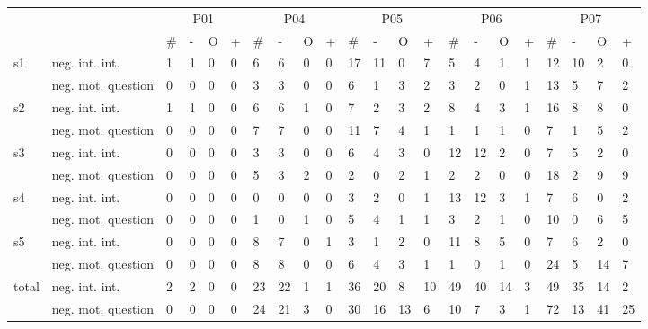 \begin{screenonly}
\begin{table*}[h]
\begin{small}
\begin{tabular*}{\hsize}{@{\extracolsep{\fill}}llllllllllllllllllllll}
      \toprule
      &  & \multicolumn{4}{c}{P01}  & \multicolumn{4}{c}{P04} & \multicolumn{4}{c}{P05} & \multicolumn{4}{c}{P06} & \multicolumn{4}{c}{P07}\\
      \cmidrule(lr){3-6}\cmidrule(lr){7-10}\cmidrule(lr){11-14}\cmidrule(lr){15-18}\cmidrule(lr){19-22}
      &  & \# & - & O & + & \# & - & O & + & \# & - & O & + & \# & - & O & + & \# & - & O & +\\
      \cmidrule(lr){3-6}\cmidrule(lr){7-10}\cmidrule(lr){11-14}\cmidrule(lr){15-18}\cmidrule(lr){19-22}
      \multirow{2}{*}{s1} & neg. int. int. & 1 & 1 & 0 & 0 & 6 & 6 & 0 & 0 & 17 & 11 & 0 & 7 & 5 & 4 & 1 & 1 & 12 & 10 & 2 & 0\\
      & neg. mot. question & 0 & 0 & 0 & 0 & 3 & 3 & 0 & 0 & 6 & 1 & 3 & 2 & 3 & 2 & 0 & 1 & 13 & 5 & 7 & 2\\
      \multirow{2}{*}{s2} & neg. int. int. & 1 & 1 & 0 & 0 & 6 & 6 & 1 & 0 & 7 & 2 & 3 & 2 & 8 & 4 & 3 & 1 & 16 & 8 & 8 & 0\\
      & neg. mot. question & 0 & 0 & 0 & 0 & 7 & 7 & 0 & 0 & 11 & 7 & 4 & 1 & 1 & 1 & 1 & 0 & 7 & 1 & 5 & 2\\
      \multirow{2}{*}{s3} & neg. int. int. & 0 & 0 & 0 & 0 & 3 & 3 & 0 & 0 & 6 & 4 & 3 & 0 & 12 & 12 & 2 & 0 & 7 & 5 & 2 & 0\\
      & neg. mot. question & 0 & 0 & 0 & 0 & 5 & 3 & 2 & 0 & 2 & 0 & 2 & 1 & 2 & 2 & 0 & 0 & 18 & 2 & 9 & 9\\
      \multirow{2}{*}{s4} & neg. int. int. & 0 & 0 & 0 & 0 & 0 & 0 & 0 & 0 & 3 & 2 & 0 & 1 & 13 & 12 & 3 & 1 & 7 & 6 & 0 & 2\\
      & neg. mot. question & 0 & 0 & 0 & 0 & 1 & 0 & 1 & 0 & 5 & 4 & 1 & 1 & 3 & 2 & 1 & 0 & 10 & 0 & 6 & 5\\
      \multirow{2}{*}{s5} & neg. int. int. & 0 & 0 & 0 & 0 & 8 & 7 & 0 & 1 & 3 & 1 & 2 & 0 & 11 & 8 & 5 & 0 & 7 & 6 & 2 & 0\\
      & neg. mot. question & 0 & 0 & 0 & 0 & 8 & 8 & 0 & 0 & 6 & 4 & 3 & 1 & 1 & 0 & 1 & 0 & 24 & 5 & 14 & 7\\
      \multirow{2}{*}{total} & neg. int. int. & 2 & 2 & 0 & 0 & 23 & 22 & 1 & 1 & 36 & 20 & 8 & 10 & 49 & 40 & 14 & 3 & 49 & 35 & 14 & 2\\
      & neg. mot. question & 0 & 0 & 0 & 0 & 24 & 21 & 3 & 0 & 30 & 16 & 13 & 6 & 10 & 7 & 3 & 1 & 72 & 13 & 41 & 25\\
    \end{tabular*}
    \setlength{\tabcolsep}{1.12ex}
    \begin{tabular*}{\hsize}{@{\extracolsep{\fill}}llllllllllllllllllllllll}

\end{tabular*}
\end{small}
\end{table*}
\end{screenonly}
